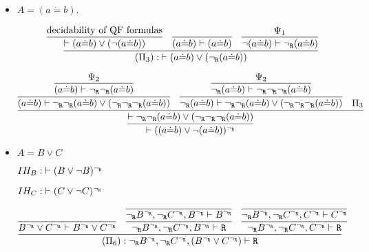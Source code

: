 \begin{enumerate}[(i)]
\begin{itemize}
        \item $A = (a \dot{=} b)$.

            $$
            \infer{
                (\Pi_3) :\:\vdash (a \dot{=} b) \vee (\ngr(a \dot{=} b))
            }{
                \infer{
                    \vdash (a \dot{=} b) \vee (\neg(a \dot{=} b))
                }{
                    \text{decidability of QF formulas}
                }
                &
                \infer{
                    (a \dot{=} b) \vdash (a \dot{=} b)
                }{
                }
                &
                \infer{
                    \neg(a \dot{=} b) \vdash \ngr(a \dot{=} b)
                }{
                    \Psi_1
                }
            }
            $$

            $$
            \infer{
                \vdash ((a \dot{=} b) \vee \neg(a \dot{=} b))^\ngr
            }{
                \infer{
                    \vdash \ngr\ngr(a \dot{=} b) \vee (\ngr\ngr\ngr(a \dot{=} b))
                }{
                    \infer{
                        (a \dot{=} b) \vdash \ngr\ngr(a \dot{=} b) \vee (\ngr\ngr\ngr(a \dot{=} b))
                    }{
                        \infer{
                            (a \dot{=} b) \vdash \ngr\ngr(a \dot{=} b)
                        }{
                            \Psi_2
                        }
                    }&
                    \infer{
                        \ngr(a \dot{=} b) \vdash \ngr\ngr(a \dot{=} b) \vee (\ngr\ngr\ngr(a \dot{=} b))
                    }{
                        \infer{
                            \ngr(a \dot{=} b) \vdash \ngr\ngr\ngr(a \dot{=} b)
                        }{
                            \Psi_2
                        }
                    }&
                    \Pi_3
                }
            }
            $$
        \item $A = B \vee C$
        
            $IH_B : \; \vdash (B \vee \neg B)^{\neg_{\texttt{R}}}$
            
            $IH_C : \; \vdash (C \vee \neg C)^{\neg_{\texttt{R}}}$

            $$
            \infer{
                (\Pi_6) : \ngr B^\ngr, \ngr C^\ngr, (B^\ngr \vee C^\ngr) \vdash \R
            }{
                    \infer{B^\ngr \vee C^\ngr \vdash B^\ngr \vee C^\ngr
                }{
                }&
                \infer{
                    \ngr B^\ngr, \ngr C^\ngr, B^\ngr \vdash \R
                }{
                    \infer{
                        \ngr B^\ngr, \ngr C^\ngr, B^\ngr \vdash B^\ngr
                    }{
                    }
                }&
                \infer{
                    \ngr B^\ngr, \ngr C^\ngr, C^\ngr \vdash \R
                }{
                    \infer{
                        \ngr B^\ngr, \ngr C^\ngr, C^\ngr \vdash C^\ngr
                    }{
                    }
                }
            }
            $$
            

\end{itemize}
\end{enumerate}
